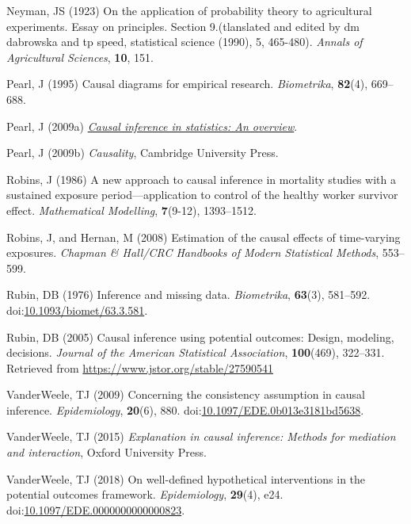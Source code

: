\documentclass[
  singlecolumn]{article}
\newlength{\cslhangindent}
\newenvironment{CSLReferences}[2] %
 {\begin{list}{}{%
  \setlength{\itemindent}{0pt}
  \setlength{\leftmargin}{0pt}
  \setlength{\parsep}{0pt}
  \ifodd #1
   \setlength{\leftmargin}{\cslhangindent}
   \setlength{\itemindent}{-1\cslhangindent}
  \fi
  \setlength{\itemsep}{#2\baselineskip}}}
 {\end{list}}
\begin{document}
\begin{CSLReferences}{1}{0}
Neyman, JS (1923) On the application of probability theory to
agricultural experiments. Essay on principles. Section 9.(tlanslated and
edited by dm dabrowska and tp speed, statistical science (1990), 5,
465-480). \emph{Annals of Agricultural Sciences}, \textbf{10}, 151.

Pearl, J (1995) Causal diagrams for empirical research.
\emph{Biometrika}, \textbf{82}(4), 669--688.

Pearl, J (2009a) \emph{\href{https://doi.org/10.1214/09-SS057}{Causal
inference in statistics: An overview}}.

Pearl, J (2009b) \emph{Causality}, Cambridge University Press.

Robins, J (1986) A new approach to causal inference in mortality studies
with a sustained exposure period---application to control of the healthy
worker survivor effect. \emph{Mathematical Modelling}, \textbf{7}(9-12),
1393--1512.

Robins, J, and Hernan, M (2008) Estimation of the causal effects of
time-varying exposures. \emph{Chapman \& Hall/CRC Handbooks of Modern
Statistical Methods}, 553--599.

Rubin, DB (1976) Inference and missing data. \emph{Biometrika},
\textbf{63}(3), 581--592.
doi:\href{https://doi.org/10.1093/biomet/63.3.581}{10.1093/biomet/63.3.581}.

Rubin, DB (2005) Causal inference using potential outcomes: Design,
modeling, decisions. \emph{Journal of the American Statistical
Association}, \textbf{100}(469), 322--331. Retrieved from
\url{https://www.jstor.org/stable/27590541}

VanderWeele, TJ (2009) Concerning the consistency assumption in causal
inference. \emph{Epidemiology}, \textbf{20}(6), 880.
doi:\href{https://doi.org/10.1097/EDE.0b013e3181bd5638}{10.1097/EDE.0b013e3181bd5638}.

VanderWeele, TJ (2015) \emph{Explanation in causal inference: Methods
for mediation and interaction}, Oxford University Press.

VanderWeele, TJ (2018) On well-defined hypothetical interventions in the
potential outcomes framework. \emph{Epidemiology}, \textbf{29}(4), e24.
doi:\href{https://doi.org/10.1097/EDE.0000000000000823}{10.1097/EDE.0000000000000823}.


\end{CSLReferences}
\end{document}
